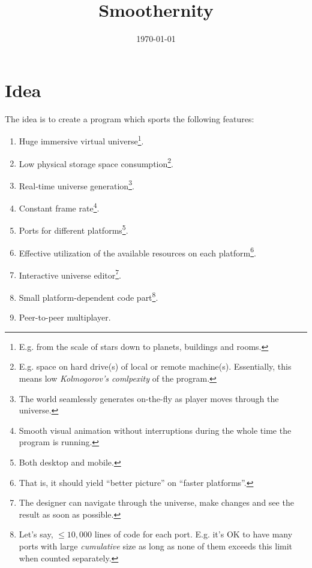 \documentclass[12pt]{article}
\title{Smoothernity}
\date{\today}
\begin{document}
\maketitle

\tableofcontents

\pagebreak

\section{Idea}

The idea is to create a program which sports the following features:

\begin{enumerate}
    \item
        Huge immersive virtual universe\footnote{
            E.g. from the scale of stars down to planets, buildings and rooms.}.
    \item
        Low physical storage space consumption\footnote{
            E.g. space on hard drive(s) of local or remote machine(s).
            Essentially, this means low \emph{Kolmogorov's comlpexity}
            of the program.}.
    \item
        Real-time universe generation\footnote{
            The world seamlessly generates on-the-fly as player moves through
            the universe.}.
    \item
        Constant frame rate\footnote{
            Smooth visual animation without interruptions during the whole
            time the program is running.}.
    \item
        Ports for different platforms\footnote{
            Both desktop and mobile.}.
    \item
        Effective utilization of the available resources on each
        platform\footnote{
            That is, it should yield ``better picture'' on
            ``faster platforms''.}.
    \item
        Interactive universe editor\footnote{
            The designer can navigate through the universe, make changes
            and see the result as soon as possible.}.
    \item
        Small platform-dependent code part\footnote{
            Let's say, \(\le 10,000\) lines of code for each port.
            E.g. it's OK to have many ports with large \emph{cumulative}
            size as long as none of them exceeds this limit when counted
            separately.}.
    \item
        Peer-to-peer multiplayer.
\end{enumerate}
\end{document}
